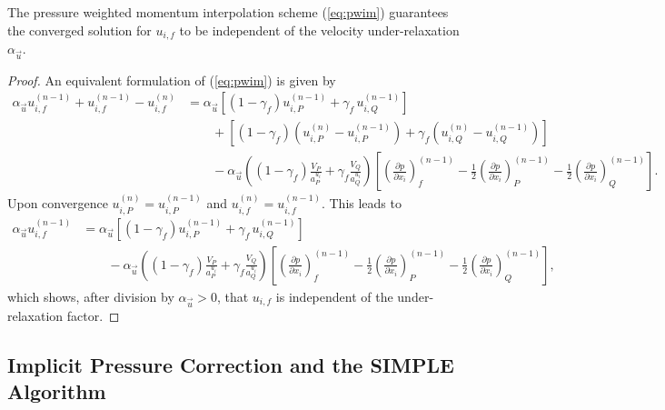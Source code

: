 \begin{prop}
  The pressure weighted momentum interpolation scheme (\ref{eq:pwim}) guarantees the converged solution for \(u_{i,f}\) to be independent of the velocity under-relaxation \(\alpha_\vec{u}\).
\end{prop}
\begin{proof}
  An equivalent formulation of (\ref{eq:pwim}) is given by
\begin{align*}
  \alpha_\vec{u} u_{i,f}^{(n-1)} + u_{i,f}^{(n-1)} - u_{i,f}^{(n)} 
  &=
  \alpha_\vec{u} \left[\left(1 - \gamma_f\right) u_{i,P}^{(n-1)} + \gamma_f \, u_{i,Q}^{(n-1)} \right] \\[1em]
  &\quad\quad + \left[\left(1 - \gamma_f\right) \left( u_{i,P}^{(n)} - u_{i,P}^{(n-1)}\right) + \gamma_f \left( u_{i,Q}^{(n)} - u_{i,Q}^{(n-1)} \right) \right] \nonumber\\[1em]
  &\quad\quad - 
  \alpha_\vec{u} \left(\left(1 - \gamma_f\right) \frac{ V_P}{a_P^{u_i}} + \gamma_f \frac{V_Q}{a_Q^{u_i}}\right)
  \left[ 
  \left(\frac{\partial p}{\partial x_i}\right)_f^{(n-1)} 
  - \frac{1}{2} \left( \frac{\partial p}{\partial x_i} \right)_P^{(n-1)} 
  - \frac{1}{2} \left(\frac{\partial p}{\partial x_i}\right)_Q^{(n-1)} 
  \right]. \nonumber
\end{align*}
Upon convergence \(u_{i,P}^{(n)} = u_{i,P}^{(n-1)}\) and \(u_{i,f}^{(n)} = u_{i,f}^{(n-1)}\). This leads to
\begin{align*}
  \alpha_\vec{u} u_{i,f}^{(n-1)} 
  &=
  \alpha_\vec{u} \left[\left(1 - \gamma_f\right) u_{i,P}^{(n-1)} + \gamma_f \, u_{i,Q}^{(n-1)} \right] \\[1em]
  &\quad\quad - 
  \alpha_\vec{u} \left(\left(1 - \gamma_f\right) \frac{ V_P}{a_P^{u_i}} + \gamma_f \frac{V_Q}{a_Q^{u_i}}\right)
  \left[ 
  \left(\frac{\partial p}{\partial x_i}\right)_f^{(n-1)} 
  - \frac{1}{2} \left( \frac{\partial p}{\partial x_i} \right)_P^{(n-1)} 
  - \frac{1}{2} \left(\frac{\partial p}{\partial x_i}\right)_Q^{(n-1)} 
  \right], \nonumber
\end{align*}
which shows, after division by \(\alpha_\vec{u} > 0\), that \(u_{i,f}\) is independent of the under-relaxation factor.
\end{proof}

\subsection{Implicit Pressure Correction and the SIMPLE Algorithm}
\label{sec:simple}

